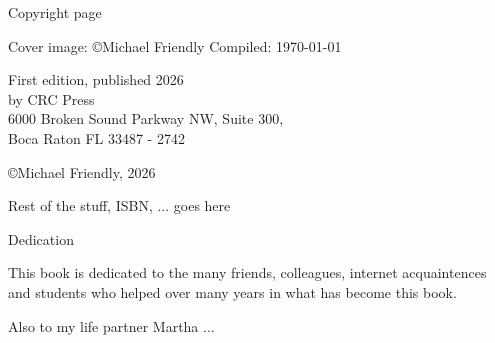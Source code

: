 
\thispagestyle{empty}

{\Large Copyright page}

Cover image: \copyright Michael Friendly
Compiled: \today

First edition, published 2026 \\
by CRC Press \\
6000 Broken Sound Parkway NW, Suite 300, \\
Boca Raton FL 33487 - 2742

\copyright Michael Friendly, 2026

Rest of the stuff, ISBN, ... goes here

\cleardoublepage

\begin{center}
{\Large Dedication}

This book is dedicated to the many friends, colleagues, internet acquaintences and students who helped over many years in what has become this book.

Also to my life partner Martha ...
\end{center}

\setlength{\abovedisplayskip}{-5pt}
\setlength{\abovedisplayshortskip}{-5pt}



\hfuzz=5.002pt